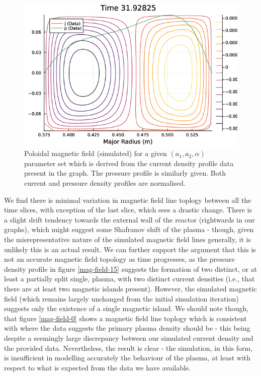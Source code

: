 \begin{figure}[h!]
    \centering
    \includegraphics[scale=0.55]{imgs/c5/magnetic-field-20.png}
    \caption{Poloidal magnetic field (simulated) for a given $(a_1, a_2, \alpha)$ parameter set which is derived 
    from the current density profile data present in the graph. The pressure profile is similarly given. Both current 
    and pressure density profiles are normalised.}
    \label{mag-field-20}
\end{figure}\newpage
We find there is minimal variation in magnetic field line toplogy between all the time slices, with exception 
of the last slice, which sees a drastic change. There is a slight drift tendency towards the external wall of the reactor (rightwards in our graphs), 
which might suggest some Shafranov shift of the plasma - though, given the misrepresentative nature of the simulated 
magnetic field lines generally, it is unlikely this is an actual result. We can further support the argument that 
this is not an accurate magnetic field topology as time progresses, as the pressure density profile in 
figure \ref{mag-field-15} suggests the formation of two distinct, or at least a partially split single, plasma, with two 
distinct current densities (i.e., that there are at least two magnetic islands present). However, the simulated magnetic field (which remains largely unchanged from the 
initial simulation iteration) suggests only the existence of a single magnetic island. We should note though, that 
figure \ref{mag-field-0} shows a magnetic field line toplogy which is consistent with where the data suggests the primary 
plasma density should be - this being despite a seemingly large discrepancy between our simulated current density and the 
provided data. Nevertheless, the result is clear - the simulation, in this form, is insufficient in modelling accurately the behaviour of the 
plasma, at least with respect to what is expected from the data we have available.

